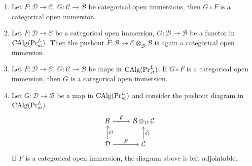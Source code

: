 \begin{lemma}\Cite[Lemma 6.4, Corollary 6.6]{clausen2022condensed}\label{compos bc and cancel for openclosedimmsersion in sym}
\begin{enumerate}
    \item Let $F : \mathcal{D} \to \mathcal{C}$, $G:\mathcal{C}\to \mathcal{B} $ be categorical open immersions, then $G\circ F$ is a categorical open immersion.
\item Let $F : \mathcal{D} \to \mathcal{C}$ be a categorical open immersion, $G: \mathcal{D} \to \mathcal{B}$ be a functor in $\operatorname{CAlg}(\Pr_{st}^L)$. Then the pushout $\tilde{F}: \mathcal{B} \to \mathcal{C}\otimes_{\mathcal{D}}\mathcal{B}$ is again a categorical open immersion. 
\item Let $F : \mathcal{D} \to \mathcal{C}$, $G:\mathcal{C}\to \mathcal{B} $ be maps in $\operatorname{CAlg}(\Pr_{st}^L)$. If $G\circ F$ is a categorical open immersion, then $G$ is a categorical open immersion.
    \item Let $G : \mathcal{D} \to \mathcal{B}$ be a map in $\operatorname{CAlg}(\Pr_{st}^L)$ and consider the pushout diagram in $\operatorname{CAlg}(\Pr_{st}^L)$.
    \[\begin{tikzcd}
	{\mathcal{B}} & {\mathcal{B}\otimes_{\mathcal{D}}\mathcal{C}} \\
	{\mathcal{D}} & {\mathcal{C}}
	\arrow["{\tilde{F}}", from=1-1, to=1-2]
	\arrow["{G}"', from=2-1, to=1-1]
	\arrow["F", from=2-1, to=2-2]
	\arrow["\tilde{G}"', from=2-2, to=1-2]
\end{tikzcd}\]
If  $F$ is a categorical open immersion, the diagram above is left adjointable.
\end{enumerate}
\end{lemma}


